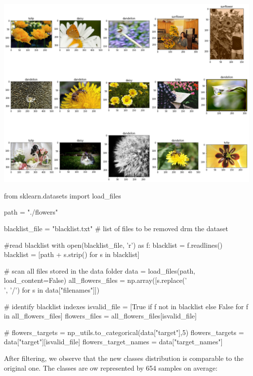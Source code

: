 \begin{center}
	\includegraphics[scale=.35]{./sections/03_methodology/output_11_1.png}
\end{center}

\begin{python}
from sklearn.datasets import load_files 
	
path = "./flowers"

blacklist_file = "blacklist.txt" # list of files to be removed drm the dataset

#read blacklist
with open(blacklist_file, 'r') as f:
	blacklist = f.readlines()
blacklist = [path + s.strip() for s in blacklist]

# scan all files stored in the data folder
data = load_files(path, load_content=False)
all_flowers_files = np.array([s.replace('\\', '/') for s in data["filenames"]])

# identify blacklist indexes
isvalid_file = [True if f not in blacklist else False for f in all_flowers_files]
flowers_files = all_flowers_files[isvalid_file]

# flowers_targets = np_utils.to_categorical(data["target"],5)
flowers_targets = data["target"][isvalid_file]
flowers_target_names = data["target_names"]
\end{python}

After filtering, we observe that the  new classes distribution is comparable to the original one. The classes are ow represented by 654 samples on average:

